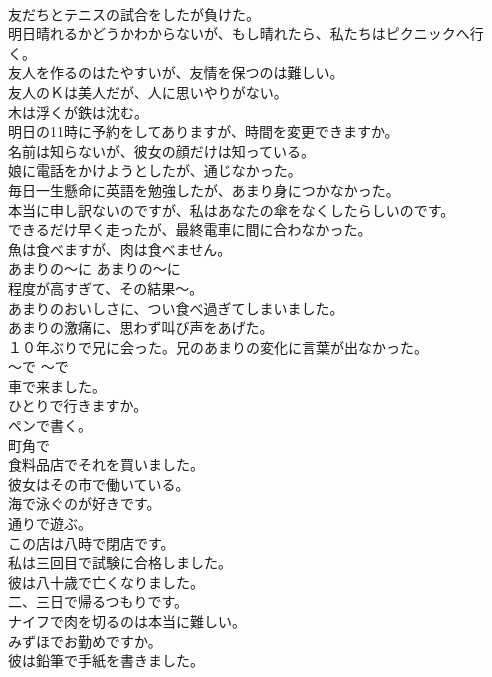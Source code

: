 \documentclass[8pt]{extreport}
\begin{document}
\begin{CJK}{UTF8}{min}
\\	友だちとテニスの試合をしたが負けた。  
\\	明日晴れるかどうかわからないが、もし晴れたら、私たちはピクニックへ行く。  
\\	友人を作るのはたやすいが、友情を保つのは難しい。  
\\	友人のＫは美人だが、人に思いやりがない。  
\\	木は浮くが鉄は沈む。  
\\	明日の11時に予約をしてありますが、時間を変更できますか。  
\\	名前は知らないが、彼女の顔だけは知っている。  
\\	娘に電話をかけようとしたが、通じなかった。  
\\	毎日一生懸命に英語を勉強したが、あまり身につかなかった。  
\\	本当に申し訳ないのですが、私はあなたの傘をなくしたらしいのです。  
\\	できるだけ早く走ったが、最終電車に間に合わなかった。  
\\	魚は食べますが、肉は食べません。  
\\	あまりの〜に	あまりの〜に	
\\	程度が高すぎて、その結果〜。	
\\	あまりのおいしさに、つい食べ過ぎてしまいました。  
\\	あまりの激痛に、思わず叫び声をあげた。  
\\	１０年ぶりで兄に会った。兄のあまりの変化に言葉が出なかった。  
\\	〜で	〜で	
\\	車で来ました。 
\\	ひとりで行きますか。
\\	ペンで書く。  
\\	町角で  
\\	食料品店でそれを買いました。  
\\	彼女はその市で働いている。  
\\	海で泳ぐのが好きです。  
\\	通りで遊ぶ。  
\\	この店は八時で閉店です。  
\\	私は三回目で試験に合格しました。  
\\	彼は八十歳で亡くなりました。  
\\	二、三日で帰るつもりです。  
\\	ナイフで肉を切るのは本当に難しい。  
\\	みずほでお勤めですか。  
\\	彼は鉛筆で手紙を書きました。  

\end{CJK}
\end{document}
